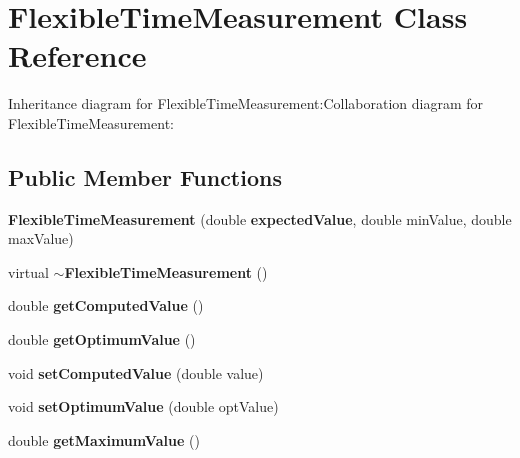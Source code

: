 \section{FlexibleTimeMeasurement Class Reference}
\label{classbr_1_1pucrio_1_1telemidia_1_1ginga_1_1ncl_1_1model_1_1time_1_1FlexibleTimeMeasurement}
Inheritance diagram for FlexibleTimeMeasurement:Collaboration diagram for FlexibleTimeMeasurement:\subsection*{Public Member Functions}
\begin{CompactItemize}
\item 
\textbf{FlexibleTimeMeasurement} (double {\bf expectedValue}, double minValue, double maxValue)\label{classbr_1_1pucrio_1_1telemidia_1_1ginga_1_1ncl_1_1model_1_1time_1_1FlexibleTimeMeasurement_985173817c54f4729ff75a3938fab35a}

\item 
virtual {\bf $\sim$FlexibleTimeMeasurement} ()\label{classbr_1_1pucrio_1_1telemidia_1_1ginga_1_1ncl_1_1model_1_1time_1_1FlexibleTimeMeasurement_dbbccfa556550cb7f317b0bace566350}

\item 
double \textbf{getComputedValue} ()\label{classbr_1_1pucrio_1_1telemidia_1_1ginga_1_1ncl_1_1model_1_1time_1_1FlexibleTimeMeasurement_966aa0047383ec75510c87d32b38ce73}

\item 
double \textbf{getOptimumValue} ()\label{classbr_1_1pucrio_1_1telemidia_1_1ginga_1_1ncl_1_1model_1_1time_1_1FlexibleTimeMeasurement_41c719c9f0b783394f3e19fc8c04f3e5}

\item 
void \textbf{setComputedValue} (double value)\label{classbr_1_1pucrio_1_1telemidia_1_1ginga_1_1ncl_1_1model_1_1time_1_1FlexibleTimeMeasurement_9a13233ccee82a95c0f8f3875f2c174d}

\item 
void \textbf{setOptimumValue} (double optValue)\label{classbr_1_1pucrio_1_1telemidia_1_1ginga_1_1ncl_1_1model_1_1time_1_1FlexibleTimeMeasurement_5d3a54073e14975721262468af870ece}

\item 
double \textbf{getMaximumValue} ()\label{classbr_1_1pucrio_1_1telemidia_1_1ginga_1_1ncl_1_1model_1_1time_1_1FlexibleTimeMeasurement_4eae4d731dbb47436edc1489a9e33cc2}


\end{CompactItemize}
